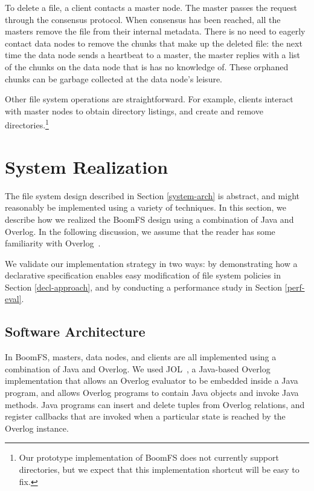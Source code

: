 \documentclass[twocolumn]{article}
\begin{document}
To delete a file, a client contacts a master node. The master passes
the request through the consensus protocol. When consensus has been
reached, all the masters remove the file from their internal
metadata. There is no need to eagerly contact data nodes to remove the
chunks that make up the deleted file: the next time the data node
sends a heartbeat to a master, the master replies with a list of the
chunks on the data node that is has no knowledge of. These orphaned
chunks can be garbage collected at the data node's leisure.

Other file system operations are straightforward. For example, clients
interact with master nodes to obtain directory listings, and create
and remove directories.\footnote{Our prototype implementation of
  BoomFS does not currently support directories, but we expect that
  this implementation shortcut will be easy to fix.}

\section{System Realization}
\label{system-realize}
The file system design described in Section \ref{system-arch} is
abstract, and might reasonably be implemented using a variety of
techniques. In this section, we describe how we realized the BoomFS
design using a combination of Java and Overlog. In the following
discussion, we assume that the reader has some familiarity with
Overlog~\cite{dn-sigmod}.

We validate our implementation strategy in two ways: by demonstrating
how a declarative specification enables easy modification of file
system policies in Section \ref{decl-approach}, and by conducting a
performance study in Section \ref{perf-eval}.

\subsection{Software Architecture}

In BoomFS, masters, data nodes, and clients are all implemented using
a combination of Java and Overlog. We used JOL~\cite{jol}, a
Java-based Overlog implementation that allows an Overlog evaluator to
be embedded inside a Java program, and allows Overlog programs to
contain Java objects and invoke Java methods. Java programs can insert
and delete tuples from Overlog relations, and register callbacks that
are invoked when a particular state is reached by the Overlog
instance.
\end{document}

